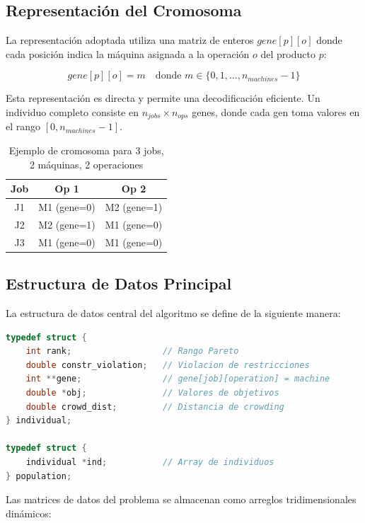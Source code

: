 \documentclass[preprint,12pt,authoryear]{elsarticle}
\begin{document}
\subsection{Representación del Cromosoma}

La representación adoptada utiliza una matriz de enteros $gene[p][o]$ donde cada posición indica la máquina asignada a la operación $o$ del producto $p$:

\begin{equation}
gene[p][o] = m \quad \text{donde } m \in \{0, 1, ..., n_{machines}-1\}
\end{equation}

Esta representación es directa y permite una decodificación eficiente. Un individuo completo consiste en $n_{jobs} \times n_{ops}$ genes, donde cada gen toma valores en el rango $[0, n_{machines}-1]$.

\begin{table}[h]
\centering
\caption{Ejemplo de cromosoma para 3 jobs, 2 máquinas, 2 operaciones}
\begin{tabular}{|c|c|c|}
\hline
\textbf{Job} & \textbf{Op 1} & \textbf{Op 2} \\
\hline
J1 & M1 (gene=0) & M2 (gene=1) \\
J2 & M2 (gene=1) & M1 (gene=0) \\
J3 & M1 (gene=0) & M1 (gene=0) \\
\hline
\end{tabular}
\end{table}

\subsection{Estructura de Datos Principal}

La estructura de datos central del algoritmo se define de la siguiente manera:

\begin{lstlisting}[language=C, caption=Estructura del individuo]
typedef struct {
    int rank;                  // Rango Pareto
    double constr_violation;   // Violacion de restricciones
    int **gene;                // gene[job][operation] = machine
    double *obj;               // Valores de objetivos
    double crowd_dist;         // Distancia de crowding
} individual;

typedef struct {
    individual *ind;           // Array de individuos
} population;
\end{lstlisting}

Las matrices de datos del problema se almacenan como arreglos tridimensionales dinámicos:
\end{document}
